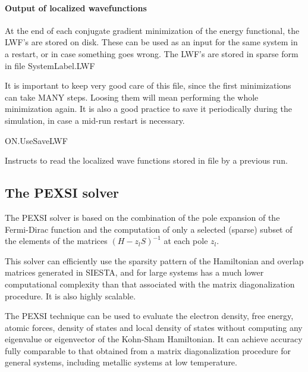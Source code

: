 \paragraph{Output of localized wavefunctions}

At the end of each conjugate gradient minimization of the energy
functional, the LWF's are stored on disk. These can be used as an
input for the same system in a restart, or in case something goes
wrong.  The LWF's are stored in sparse form in file SystemLabel.LWF

It is important to keep very good care of this file, since the first
minimizations can take MANY steps. Loosing them will mean performing
the whole minimization again. It is also a good practice to save it
periodically during the simulation, in case a mid-run restart is
necessary.

\begin{fdflogicalF}{ON.UseSaveLWF}

  Instructs to read the localized wave functions stored in file
   by a previous run.

\end{fdflogicalF}


\subsection{The PEXSI solver}
\label{SolverPEXSI}

The PEXSI solver is based on the combination of the pole expansion of
the Fermi-Dirac function and the computation of only a selected
(sparse) subset of the elements of the matrices $(H-z_lS)^{-1}$ at
each pole $z_l$.

This solver can efficiently use the sparsity pattern of
the Hamiltonian and overlap matrices generated in SIESTA, and for
large systems has a much lower computational complexity than that
associated with the matrix diagonalization procedure. It is also
highly scalable.

The PEXSI technique can be used to evaluate the electron density, free
energy, atomic forces, density of states and local density of states
without computing any eigenvalue or eigenvector of the Kohn-Sham
Hamiltonian. It can achieve accuracy fully comparable to that obtained
from a matrix diagonalization procedure for general systems, including
metallic systems at low temperature.  

